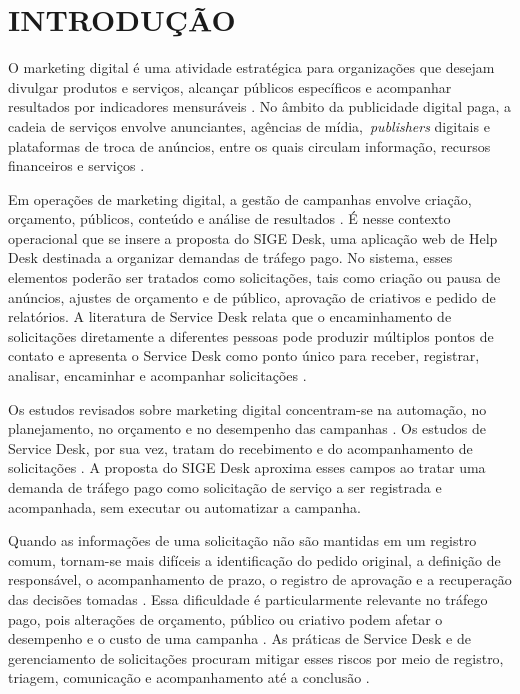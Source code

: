 \section{\esp INTRODUÇÃO}

O marketing digital é uma atividade estratégica para organizações que desejam divulgar produtos e serviços, alcançar públicos específicos e acompanhar resultados por indicadores mensuráveis \cite{gujar2024,younas2025}. No âmbito da publicidade digital paga, a cadeia de serviços envolve anunciantes, agências de mídia, \,\textit{publishers} digitais e plataformas de troca de anúncios, entre os quais circulam informação, recursos financeiros e serviços \cite{agus2019}.

Em operações de marketing digital, a gestão de campanhas envolve criação, orçamento, públicos, conteúdo e análise de resultados \cite{younas2025,yahia2024,nain2025}. É nesse contexto operacional que se insere a proposta do SIGE Desk, uma aplicação web de Help Desk destinada a organizar demandas de tráfego pago. No sistema, esses elementos poderão ser tratados como solicitações, tais como criação ou pausa de anúncios, ajustes de orçamento e de público, aprovação de criativos e pedido de relatórios. A literatura de Service Desk relata que o encaminhamento de solicitações diretamente a diferentes pessoas pode produzir múltiplos pontos de contato e apresenta o Service Desk como ponto único para receber, registrar, analisar, encaminhar e acompanhar solicitações \cite{firmansyah2022,fenner2015,amanullah2017}.

Os estudos revisados sobre marketing digital concentram-se na automação, no planejamento, no orçamento e no desempenho das campanhas \cite{gujar2024,younas2025,yahia2024,nain2025}. Os estudos de Service Desk, por sua vez, tratam do recebimento e do acompanhamento de solicitações \cite{firmansyah2022,fenner2015,amanullah2017}. A proposta do SIGE Desk aproxima esses campos ao tratar uma demanda de tráfego pago como solicitação de serviço a ser registrada e acompanhada, sem executar ou automatizar a campanha.

Quando as informações de uma solicitação não são mantidas em um registro comum, tornam-se mais difíceis a identificação do pedido original, a definição de responsável, o acompanhamento de prazo, o registro de aprovação e a recuperação das decisões tomadas \cite{fenner2015,servicedesk2023,servicerequest2020}. Essa dificuldade é particularmente relevante no tráfego pago, pois alterações de orçamento, público ou criativo podem afetar o desempenho e o custo de uma campanha \cite{yahia2024}. As práticas de Service Desk e de gerenciamento de solicitações procuram mitigar esses riscos por meio de registro, triagem, comunicação e acompanhamento até a conclusão \cite{firmansyah2022,servicedesk2023,servicerequest2020}.

